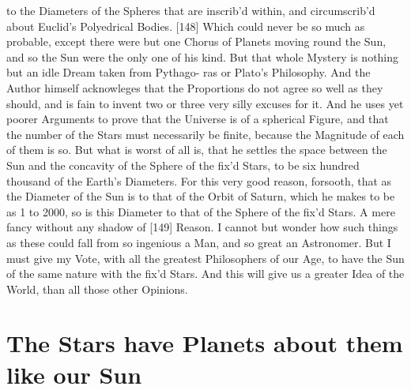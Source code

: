 \documentclass[letterpaper]{book}
\begin{document}
to the Diameters of the Spheres that are inscrib'd within, and circumscrib'd
about Euclid's Polyedrical Bodies. [148] Which could never be so much as
probable, except there were but one Chorus of Planets moving round the
Sun, and so the Sun were the only one of his kind.
But that whole Mystery is nothing but an idle Dream taken from Pythago-
ras or Plato's Philosophy. And the Author himself acknowleges that the
Proportions do not agree so well as they should, and is fain to invent two or
three very silly excuses for it. And he uses yet poorer Arguments to prove
that the Universe is of a spherical Figure, and that the number of the Stars
must necessarily be finite, because the Magnitude of each of them is so.
But what is worst of all is, that he settles the space between the Sun and
the concavity of the Sphere of the fix'd Stars, to be six hundred thousand
of the Earth's Diameters. For this very good reason, forsooth, that as the
Diameter of the Sun is to that of the Orbit of Saturn, which he makes to be
as 1 to 2000, so is this Diameter to that of the Sphere of the fix'd Stars. A
mere fancy without any shadow of [149] Reason. I cannot but wonder how
such things as these could fall from so ingenious a Man, and so great an
Astronomer. But I must give my Vote, with all the greatest Philosophers of
our Age, to have the Sun of the same nature with the fix'd Stars. And this
will give us a greater Idea of the World, than all those other Opinions.


\section{The Stars have Planets about them like our Sun}
\end{document}
